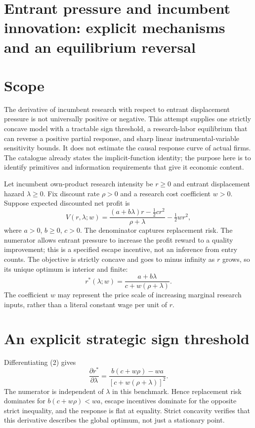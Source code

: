 \documentclass[11pt,a4paper]{article}
\begin{document}
\section*{Entrant pressure and incumbent innovation: explicit mechanisms and an equilibrium reversal}
\section{Scope}
The derivative of incumbent research with respect to entrant displacement pressure is not universally positive or negative. This attempt supplies one strictly concave model with a tractable sign threshold, a research-labor equilibrium that can reverse a positive partial response, and sharp linear instrumental-variable sensitivity bounds. It does not estimate the causal response curve of actual firms. The catalogue already states the implicit-function identity; the purpose here is to identify primitives and information requirements that give it economic content.

Let incumbent own-product research intensity be $r\ge0$ and entrant displacement hazard $\lambda\ge0$. Fix discount rate $\rho>0$ and a research cost coefficient $w>0$. Suppose expected discounted net profit is
\[
 V(r,\lambda;w)=\frac{(a+b\lambda)r-\tfrac12cr^2}{\rho+\lambda}
                    -\tfrac12wr^2,                      \tag{1}
\]
where $a>0$, $b\ge0$, $c>0$. The denominator captures replacement risk. The numerator allows entrant pressure to increase the profit reward to a quality improvement; this is a specified escape incentive, not an inference from entry counts. The objective is strictly concave and goes to minus infinity as $r$ grows, so its unique optimum is interior and finite:
\[
 r^*(\lambda;w)=\frac{a+b\lambda}{c+w(\rho+\lambda)}.        \tag{2}
\]
The coefficient $w$ may represent the price scale of increasing marginal research inputs, rather than a literal constant wage per unit of $r$.

\section{An explicit strategic sign threshold}
Differentiating (2) gives
\[
 \frac{\partial r^*}{\partial\lambda}
 =\frac{b(c+w\rho)-wa}{[c+w(\rho+\lambda)]^2}.             \tag{3}
\]
The numerator is independent of $\lambda$ in this benchmark. Hence replacement risk dominates for $b(c+w\rho)<wa$, escape incentives dominate for the opposite strict inequality, and the response is flat at equality. Strict concavity verifies that this derivative describes the global optimum, not just a stationary point.
\end{document}
